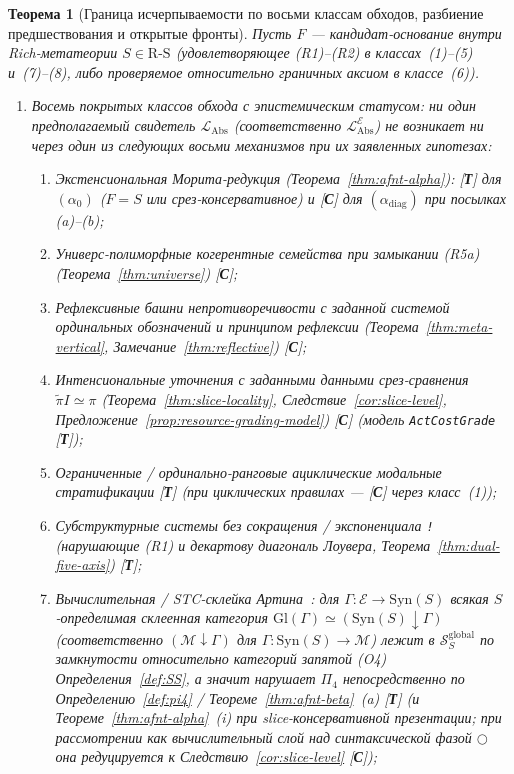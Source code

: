 \documentclass[11pt]{article}
\theoremstyle{plain}
\newtheorem{theorem}{Теорема}[section]
\theoremstyle{definition}
\newcommand{\RS}{\mathrm{R\text{-}S}}
\newcommand{\cS}{\mathcal{S}}
\newcommand{\LAbs}{\mathcal{L}_{\mathrm{Abs}}}
\newcommand{\Syn}{\mathrm{Syn}}
\newcommand{\tpi}{\widetilde{\pi}}
\newcommand{\cE}{\mathcal{E}}
\newcommand{\LAbsE}{\LAbs^{\cE}}
\begin{document}
\begin{theorem}[Граница исчерпываемости по восьми классам обходов, разбиение предшествования и открытые фронты]\label{thm:q3-exhaustiveness-boundary}
Пусть $F$ — кандидат-основание внутри Rich-метатеории $S \in \RS$ (удовлетворяющее (R1)--(R2) в классах~(1)--(5) и~(7)--(8), либо проверяемое относительно граничных аксиом в классе~(6)).
\begin{enumerate}[nosep,label=(\roman*)]
\item \emph{Восемь покрытых классов обхода с эпистемическим статусом}: ни один предполагаемый свидетель $\LAbs$ (соответственно $\LAbsE$) не возникает ни через один из следующих восьми механизмов при их заявленных гипотезах:
  \begin{enumerate}[nosep,label=(\arabic*)]
  \item \emph{Экстенсиональная Морита-редукция} (Теорема~\ref{thm:afnt-alpha}): \textup{[\textbf{Т}]} для $(\alpha_0)$ ($F = S$ или срез-консервативное) и \textup{[\textbf{С}]} для $(\alpha_{\mathrm{diag}})$ при посылках (a)--(b);
  \item \emph{Универс-полиморфные когерентные семейства} при замыкании (R5a) (Теорема~\ref{thm:universe}) \textup{[\textbf{С}]};
  \item \emph{Рефлексивные башни непротиворечивости} с заданной системой ординальных обозначений и принципом рефлексии (Теорема~\ref{thm:meta-vertical}, Замечание~\ref{thm:reflective}) \textup{[\textbf{С}]};
  \item \emph{Интенсиональные уточнения} с заданными данными срез-сравнения $\tpi I \simeq \pi$ (Теорема~\ref{thm:slice-locality}, Следствие~\ref{cor:slice-level}, Предложение~\ref{prop:resource-grading-model}) \textup{[\textbf{С}]} (модель \texttt{ActCostGrade} \textup{[\textbf{Т}]});
  \item \emph{Ограниченные / ординально-ранговые ациклические модальные стратификации} \textup{[\textbf{Т}]} (при циклических правилах --- \textup{[\textbf{С}]} через класс~(1));
  \item \emph{Субструктурные системы без сокращения / экспоненциала \texttt{!}} (нарушающие (R1) и декартову диагональ Лоувера, Теорема~\ref{thm:dual-five-axis}) \textup{[\textbf{Т}]};
  \item \emph{Вычислительная / STC-склейка Артина}~\cite{Sterling2021}: для $\Gamma : \mathcal{E} \to \Syn(S)$ всякая $S$-определимая склеенная категория $\mathrm{Gl}(\Gamma) \simeq (\Syn(S)\downarrow \Gamma)$ (соответственно $(\mathcal{M}\downarrow\Gamma)$ для $\Gamma : \Syn(S)\to\mathcal{M}$) лежит в $\cS_S^{\mathrm{global}}$ по замкнутости относительно категорий запятой (O4) Определения~\ref{def:SS}, а значит нарушает $\Pi_4$ непосредственно по Определению~\ref{def:pi4} / Теореме~\ref{thm:afnt-beta}~(a) \textup{[\textbf{Т}]} (и Теореме~\ref{thm:afnt-alpha}~(i) при slice-консервативной презентации; при рассмотрении как вычислительный слой над синтаксической фазой $\bigcirc$ она редуцируется к Следствию~\ref{cor:slice-level} \textup{[\textbf{С}]});

\end{enumerate}
\end{enumerate}
\end{theorem}
\end{document}
